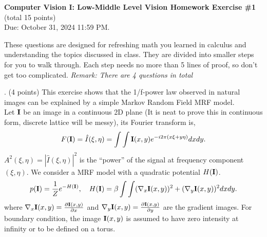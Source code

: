 \documentclass[11pt]{article}
\newcommand{\I}{{\bf I}}
\begin{document}
\begin{center}
{\bf Computer Vision I: Low-Middle Level Vision  Homework Exercise \#1 }  \\ (total 15 points)   \\
Due: October 31, 2024 11:59 PM.
\end{center}

\vspace{5mm}

These questions are designed for refreshing  math you learned in calculus and  understanding the topics discussed in class. They are divided into smaller steps for you to walk through.   Each step needs no more than 5 lines of proof, so don't get too complicated.  
{\em Remark: There are 4 questions in total }

\vspace{5mm}

. (4 points) This exercise shows that the 1/f-power law
observed in natural images can be explained by a simple Markov Random Field MRF model.  \\

 Let $\I$ be an image  in a continuous 2D plane (It is neat to prove this in continuous form, discrete lattice will be messy), its Fourier
transform is,
\[
      F(\I) = \hat{I}(\xi,\eta) = \int\int \I(x,y) e^{-i2\pi (x \xi +
      y\eta)} dxdy.
\]
$A^2(\xi, \eta) = |\hat{I}(\xi,\eta)|^2$ is the ``power'' of the
signal at frequency component $(\xi,\eta)$. We consider a MRF model
with a quadratic potential $H(\I)$.
\[
    p(\I)=\frac{1}{Z} e^{-H(\I)}, \quad H(\I)=\beta \int\int
    (\nabla_x\I(x,y))^2+(\nabla_y\I(x,y))^2 dxdy.
\]
where $\nabla_x \I(x,y)=\frac{\partial \I(x,y)}{\partial x}$ and
$\nabla_y \I(x,y)=\frac{\partial \I(x,y)}{\partial y}$ are the gradient images. For boundary
condition,  the image $\I(x,y)$ is assumed to have zero intensity at
infinity or to be defined on a torus.
\end{document}

